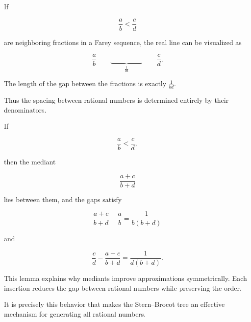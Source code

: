 
\begin{remark}

If

\[
\frac{a}{b} < \frac{c}{d}
\]

are neighboring fractions in a Farey sequence, the real line can be
visualized as

\[
\frac{a}{b}
\qquad
\underbrace{\hspace{2cm}}_{\displaystyle \frac{1}{bd}}
\qquad
\frac{c}{d}.
\]

The length of the gap between the fractions is exactly
$\frac{1}{bd}$.

Thus the spacing between rational numbers is determined entirely by
their denominators.

\end{remark}



\begin{lemma}
\label{lem:mediant-gap}

If

\[
\frac{a}{b} < \frac{c}{d},
\]

then the mediant

\[
\frac{a+c}{b+d}
\]

lies between them, and the gaps satisfy

\[
\frac{a+c}{b+d}-\frac{a}{b}
=
\frac{1}{b(b+d)}
\]

and

\[
\frac{c}{d}-\frac{a+c}{b+d}
=
\frac{1}{d(b+d)}.
\]

\end{lemma}

\begin{remark}

This lemma explains why mediants improve approximations
symmetrically.  Each insertion reduces the gap between rational
numbers while preserving the order.

It is precisely this behavior that makes the Stern--Brocot tree an
effective mechanism for generating all rational numbers.

\end{remark}




















